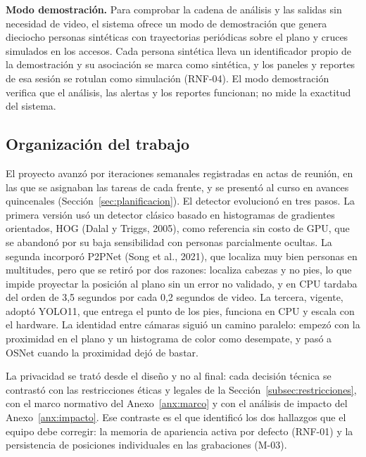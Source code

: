 \textbf{Modo demostración.} Para comprobar la cadena de análisis y las salidas sin necesidad de
video, el sistema ofrece un modo de demostración que genera dieciocho personas sintéticas con
trayectorias periódicas sobre el plano y cruces simulados en los accesos. Cada persona
sintética lleva un identificador propio de la demostración y su asociación se marca como
sintética, y los paneles y reportes de esa sesión se rotulan como simulación (RNF-04). El modo
demostración verifica que el análisis, las alertas y los reportes funcionan; no mide la exactitud
del sistema.

\subsection{Organización del trabajo}
\label{subsec:met-trabajo}

El proyecto avanzó por iteraciones semanales registradas en actas de reunión, en las que se
asignaban las tareas de cada frente, y se presentó al curso en avances quincenales
(Sección~\ref{sec:planificacion}). El detector evolucionó en tres
pasos. La primera versión usó un detector clásico basado en histogramas de gradientes
orientados, HOG (Dalal y Triggs, 2005), como referencia sin costo de GPU, que se abandonó por
su baja sensibilidad con personas parcialmente ocultas. La segunda incorporó P2PNet (Song et al.,
2021), que localiza muy bien personas en multitudes, pero que se retiró por dos razones: localiza
cabezas y no pies, lo que impide proyectar la posición al plano sin un error no validado, y en
CPU tardaba del orden de 3,5 segundos por cada 0,2 segundos de video. La tercera, vigente,
adoptó YOLO11, que entrega el punto de los pies, funciona en CPU y escala con el hardware. La
identidad entre cámaras siguió un camino paralelo: empezó con la proximidad en el plano y un
histograma de color como desempate, y pasó a OSNet cuando la proximidad dejó de bastar.

La privacidad se trató desde el diseño y no al final: cada decisión técnica se contrastó con las
restricciones éticas y legales de la Sección~\ref{subsec:restricciones}, con el marco normativo
del Anexo~\ref{anx:marco} y con el análisis de impacto del Anexo~\ref{anx:impacto}. Ese
contraste es el que identificó los dos hallazgos que el equipo debe corregir: la memoria de
apariencia activa por defecto (RNF-01) y la persistencia de posiciones individuales en las
grabaciones (M-03).

